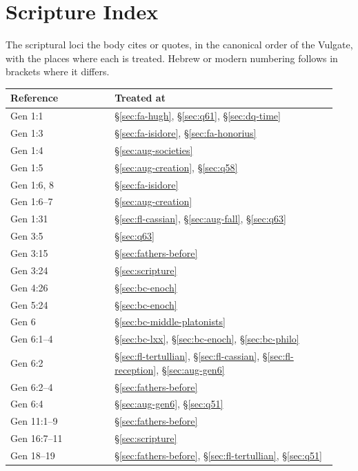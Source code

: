 \section{Scripture Index}\label{app:scripture}

The scriptural loci the body cites or quotes, in the canonical order of
the Vulgate, with the places where each is treated. Hebrew or modern
numbering follows in brackets where it differs.

\begingroup\footnotesize
\begin{longtable}{>{\raggedright\arraybackslash}p{0.30\linewidth}>{\raggedright\arraybackslash}p{0.64\linewidth}}
\toprule
\textbf{Reference} & \textbf{Treated at}\\
\midrule
\endhead
\bottomrule
\endfoot
Gen 1:1 & \S\ref{sec:fa-hugh}, \S\ref{sec:q61}, \S\ref{sec:dq-time}\\
Gen 1:3 & \S\ref{sec:fa-isidore}, \S\ref{sec:fa-honorius}\\
Gen 1:4 & \S\ref{sec:aug-societies}\\
Gen 1:5 & \S\ref{sec:aug-creation}, \S\ref{sec:q58}\\
Gen 1:6, 8 & \S\ref{sec:fa-isidore}\\
Gen 1:6--7 & \S\ref{sec:aug-creation}\\
Gen 1:31 & \S\ref{sec:fl-cassian}, \S\ref{sec:aug-fall}, \S\ref{sec:q63}\\
Gen 3:5 & \S\ref{sec:q63}\\
Gen 3:15 & \S\ref{sec:fathers-before}\\
Gen 3:24 & \S\ref{sec:scripture}\\
Gen 4:26 & \S\ref{sec:bc-enoch}\\
Gen 5:24 & \S\ref{sec:bc-enoch}\\
Gen 6 & \S\ref{sec:bc-middle-platonists}\\
Gen 6:1--4 & \S\ref{sec:bc-lxx}, \S\ref{sec:bc-enoch}, \S\ref{sec:bc-philo}\\
Gen 6:2 & \S\ref{sec:fl-tertullian}, \S\ref{sec:fl-cassian}, \S\ref{sec:fl-reception}, \S\ref{sec:aug-gen6}\\
Gen 6:2--4 & \S\ref{sec:fathers-before}\\
Gen 6:4 & \S\ref{sec:aug-gen6}, \S\ref{sec:q51}\\
Gen 11:1--9 & \S\ref{sec:fathers-before}\\
Gen 16:7--11 & \S\ref{sec:scripture}\\
Gen 18--19 & \S\ref{sec:fathers-before}, \S\ref{sec:fl-tertullian}, \S\ref{sec:q51}\\

\end{longtable}
